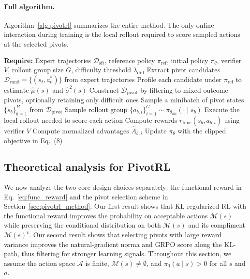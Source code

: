 \paragraph{Full algorithm.}
Algorithm~\ref{alg:pivotrl} summarizes the entire method. The only online interaction during training is the local rollout required to score sampled actions at the selected pivots.

\begin{algorithm}[t]
\caption{PivotRL}
\label{alg:pivotrl}
\begin{algorithmic}[1]
\State \textbf{Require:} Expert trajectories $\mathcal{D}_{\mathrm{sft}}$, reference policy $\pi_{\mathrm{ref}}$, initial policy $\pi_\theta$, verifier $V$, rollout group size $G$, difficulty threshold $\lambda_{\mathrm{diff}}$
\State Extract pivot candidates $\mathcal{D}_{\mathrm{cand}}=\{(s_t,a_t^*)\}$ from expert trajectories
\State Profile each candidate under $\pi_{\mathrm{ref}}$ to estimate $\hat{\mu}(s)$ and $\hat{\sigma}^2(s)$
\State Construct $\mathcal{D}_{\mathrm{pivot}}$ by filtering to mixed-outcome pivots, optionally retaining only difficult ones
    \State Sample a minibatch of pivot states $\{s_b\}_{b=1}^B$ from $\mathcal{D}_{\mathrm{pivot}}$
        \State Sample rollout group $\{a_{b,i}\}_{i=1}^G \sim \pi_{\theta_{\mathrm{old}}}(\cdot\mid s_b)$
        \State Execute the local rollout needed to score each action
        \State Compute rewards $r_{\mathrm{func}}(s_b,a_{b,i})$ using verifier $V$
        \State Compute normalized advantages $\hat{A}_{b,i}$
    \EndFor
    \State Update $\pi_\theta$ with the clipped objective in Eq.~(8)
\EndFor
\end{algorithmic}
\end{algorithm}

\subsection{Theoretical analysis for PivotRL}
\label{sec:pivotrl_analysis}

We now analyze the two core design choices separately: the functional reward in Eq.~\eqref{eq:func_reward} and the pivot selection scheme in Section~\ref{sec:pivotrl_method}. Our first result shows that KL-regularized RL with the functional reward improves the probability on acceptable actions $\mathcal{M}(s)$ while preserving the conditional distribution on both $\mathcal{M}(s)$ and its compliment $\mathcal{M}(s)^c$. Our second result shows that selecting pivots with large reward variance improves the natural-gradient norma and GRPO score along the KL-path, thus filtering for stronger learning signals.
Throughout this section, we assume the action space $\mathcal{A}$ is finite, $\mathcal{M}(s) \neq \emptyset$, and $\pi_0(a\mid s)>0$ for all $s$ and $a$. 

